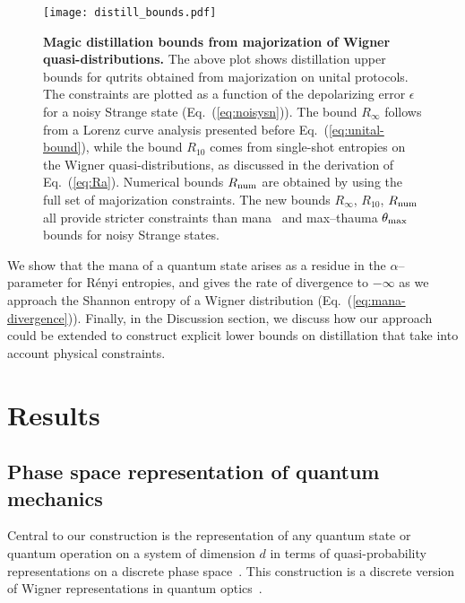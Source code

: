 \documentclass[
onecolumn,
superscriptaddress
]{revtex4-1}
\begin{document}
\begin{figure}[t]
    \centering
    \texttt{[image: distill\_bounds.pdf]}
    \caption{\textbf{Magic distillation bounds from majorization of Wigner quasi-distributions.} The above plot shows distillation upper bounds for qutrits obtained from majorization on unital protocols. The constraints are plotted as a function of the depolarizing error $\epsilon$ for a noisy Strange state (Eq.~(\ref{eq:noisysn})). The bound $R_\infty$ follows from a Lorenz curve analysis presented before Eq.~(\ref{eq:unital-bound}), while the bound $R_{10}$ comes from single-shot entropies on the Wigner quasi-distributions, as discussed in the derivation of Eq.~(\ref{eq:Ra}). Numerical bounds $R_{\rm{num}}$ are obtained by using the full set of majorization constraints. The new bounds $R_\infty$, $R_{10}$, $R_{\rm{num}}$ all provide stricter constraints than mana~\cite{cit:veitch2} and max--thauma $\theta_{\rm{max}}$~\cite{Wang_2020} bounds for noisy Strange states.
    }
    \label{fig:distill_bounds}
\end{figure}


We show that the mana of a quantum state arises as a residue in the $\alpha$--parameter for R\'{e}nyi entropies, and gives the rate of divergence to $-\infty$ as we approach the Shannon entropy of a Wigner distribution (Eq.~(\ref{eq:mana-divergence})).
Finally, in the Discussion section, we discuss how our approach could be extended to construct explicit lower bounds on distillation that take into account physical constraints.

\section*{Results}

\subsection*{Phase space representation of quantum mechanics}

Central to our construction is the representation of any quantum state or quantum operation on a system of dimension $d$ in terms of quasi-probability representations on a discrete phase space~\cite{Gross2006, Ferrie_2008}. This construction is a discrete version of Wigner representations in quantum optics~\cite{Wigner_1932, Vourdas_2004, Kenfack_2004}.
\end{document}
